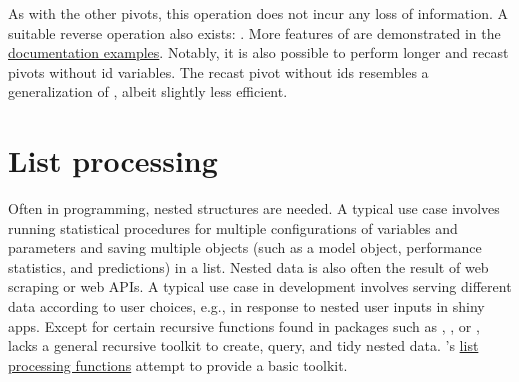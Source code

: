 \documentclass[article]{jss}
\newcommand{\fct}[1]{\code{#1()}}
\begin{document}
%
As with the other pivots, this operation does not incur any loss of information. A suitable reverse operation also exists: . More features of \fct{pivot} are demonstrated in the \href{https://sebkrantz.github.io/collapse/reference/pivot.html#ref-examples}{documentation examples}. Notably, it is also possible to perform longer and recast pivots without id variables. The recast pivot without ids resembles a generalization of , albeit slightly less efficient.
%
\section{List processing} \label{sec:list_proc}
%
Often in programming, nested structures are needed. A typical use case involves running statistical procedures for multiple configurations of variables and parameters and saving multiple objects (such as a model object, performance statistics, and predictions) in a list. Nested data is also often the result of web scraping or web APIs. A typical use case in development involves serving different data according to user choices, e.g., in response to nested user inputs in shiny apps. Except for certain recursive functions found in packages such as , , or ,  lacks a general recursive toolkit to create, query, and tidy nested data. 's \href{https://sebkrantz.github.io/collapse/reference/list-processing.html}{list processing functions} attempt to provide a basic toolkit. \newline
\end{document}
